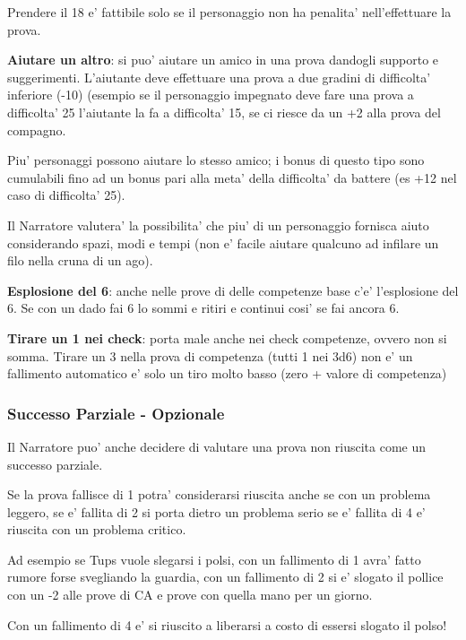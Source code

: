 \documentclass[a4paper,11pt,twoside,openany]{book}
\begin{document}
Prendere il 18 e' fattibile solo se il personaggio non ha penalita' nell'effettuare la prova.

\textbf{Aiutare un altro}: si puo' aiutare un amico in una prova dandogli supporto e suggerimenti. L'aiutante deve effettuare una prova a due gradini di difficolta' inferiore (-10) (esempio se il personaggio impegnato deve fare una prova a difficolta' 25 l'aiutante la fa a difficolta' 15, se ci riesce da un +2 alla prova del compagno.


Piu' personaggi possono aiutare lo stesso amico; i bonus di questo tipo sono cumulabili fino ad un bonus pari alla meta' della difficolta' da battere (es +12 nel caso di difficolta' 25).

Il Narratore valutera' la possibilita' che piu' di un personaggio fornisca aiuto considerando spazi, modi e tempi (non e' facile aiutare qualcuno ad infilare un filo nella cruna di un ago).

\textbf{Esplosione del 6}: anche nelle prove di delle competenze base c'e' l'esplosione del 6. Se con un dado fai 6 lo sommi e ritiri e continui cosi' se fai ancora 6.

\textbf{Tirare un 1 nei check}: porta male anche nei check competenze, ovvero non si somma.
Tirare un 3 nella prova di competenza (tutti 1 nei 3d6) non e' un fallimento automatico e' solo un tiro molto basso (zero + valore di competenza)

\subsubsection{Successo Parziale - Opzionale}

Il Narratore puo' anche decidere di valutare una prova non riuscita come un successo parziale.

Se la prova fallisce di 1 potra' considerarsi riuscita anche se con un problema leggero, se e' fallita di 2 si porta dietro un problema serio se e' fallita di 4 e' riuscita con un problema critico.

Ad esempio se Tups vuole slegarsi i polsi, con un fallimento di 1 avra' fatto rumore forse svegliando la guardia, con un fallimento di 2 si e' slogato il pollice con un -2 alle prove di CA e prove con quella mano per un giorno.

Con un fallimento di 4 e' si riuscito a liberarsi a costo di essersi slogato il polso!
\end{document}
